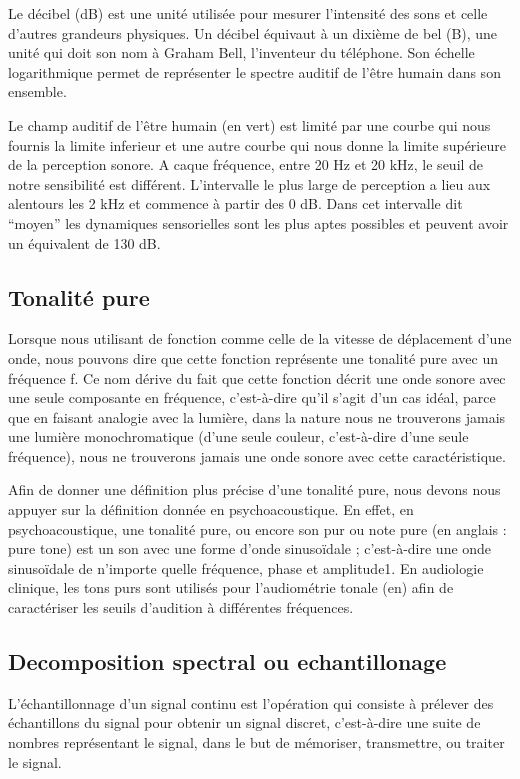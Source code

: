 \documentclass[conference,onecolumn]{IEEEtran}
\begin{document}
Le décibel (dB) est une unité utilisée pour mesurer l'intensité des sons et celle d'autres grandeurs physiques. Un décibel équivaut à un dixième de bel (B), une unité qui doit son nom à Graham Bell, l'inventeur du téléphone. Son échelle logarithmique permet de représenter le spectre auditif de l’être humain dans son ensemble. 

 Le champ auditif de l’être humain (en vert) est limité par une courbe qui nous fournis la limite inferieur et une autre courbe qui nous donne la limite supérieure de la perception sonore. A caque fréquence, entre 20 Hz et 20 kHz, le seuil de notre sensibilité est différent. L’intervalle le plus large de perception a lieu aux alentours les 2 kHz et commence à partir des 0 dB. Dans cet intervalle dit “moyen” les dynamiques sensorielles sont les plus aptes possibles et peuvent avoir un équivalent de 130 dB.  
 
 \subsection{Tonalité pure}
 Lorsque nous utilisant de fonction comme celle de la vitesse de déplacement d’une onde, nous pouvons dire que cette fonction représente une tonalité pure avec un fréquence f. Ce nom dérive du fait que cette fonction décrit une onde sonore avec une seule composante en fréquence, c’est-à-dire qu’il s’agit d’un cas idéal, parce que en faisant analogie avec la lumière, dans la nature nous ne trouverons jamais une lumière monochromatique (d’une seule couleur, c’est-à-dire d’une seule fréquence), nous ne trouverons jamais une onde sonore avec cette caractéristique.  

Afin de donner une définition plus précise d’une tonalité pure, nous devons nous appuyer sur la définition donnée en psychoacoustique. En effet, en psychoacoustique, une tonalité pure, ou encore son pur ou note pure (en anglais : pure tone) est un son avec une forme d'onde sinusoïdale ; c'est-à-dire une onde sinusoïdale de n'importe quelle fréquence, phase et amplitude1. En audiologie clinique, les tons purs sont utilisés pour l'audiométrie tonale (en) afin de caractériser les seuils d'audition à différentes fréquences. 

\subsection{Decomposition spectral ou echantillonage}

L'échantillonnage d'un signal continu est l'opération qui consiste à prélever des échantillons du signal pour obtenir un signal discret, c'est-à-dire une suite de nombres représentant le signal, dans le but de mémoriser, transmettre, ou traiter le signal. 
\end{document}
